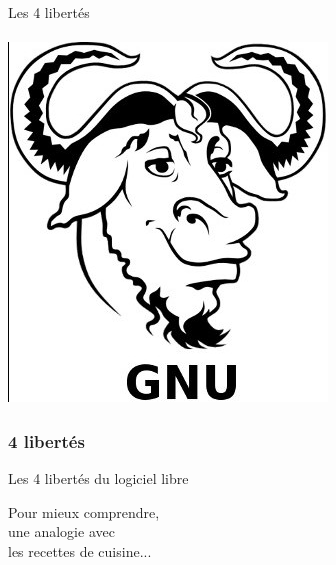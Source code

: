 \documentclass{beamer}
\begin{document}
\begin{frame}
\begin{center}
\Huge{Les 4 libertés}
\\~\\
\includegraphics[scale=1] {./images/gnu.jpg} 
\end{center}
\end{frame}

\begin{frame}
\frametitle{4 libertés}
\begin{block}{Les 4 libertés du logiciel libre}
\begin{itemize}
\end{itemize}
\end{block}
\end{frame}

\begin{frame}
\begin{center}
\Huge{Pour mieux comprendre,\\ une analogie  avec \\les recettes de cuisine...}
\end{center}
\end{frame}
\end{document}
